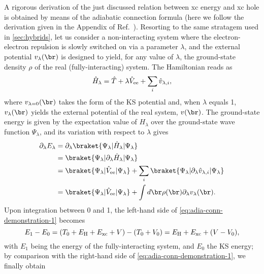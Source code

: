 A rigorous derivation of the just discussed relation between xc energy and xc hole is obtained by means of the adiabatic connection formula (here we follow the derivation given in the Appendix of Ref.~\cite{becke_correlation_1988}). Resorting to the same stratagem used in \cref{sec:hybrids}, let us consider a non-interacting system where the electron-electron repulsion is slowly switched on via a parameter $\lambda$, and the external potential $v_{\lambda}(\br)$ is designed to yield, for any value of $\lambda$, the ground-state density $\rho$ of the real (fully-interacting) system. The Hamiltonian reads as
%
\begin{equation}
    \hat{H}_{\lambda} = \hat{T} + \lambda \hat{V}_{\rm ee} + \sum_i \hat{v}_{\lambda,i} ,
    \label{eq:adia-conn-hamiltonian}
\end{equation}
%
where $v_{\lambda=0}(\br)$ takes the form of the KS potential and, when $\lambda$ equals 1, $v_{\lambda}(\br)$ yields the external potential of the real system, $v(\br)$. The ground-state energy is given by the expectation value of $H_{\lambda}$ over the ground-state wave function $\Psi_{\lambda}$, and its variation with respect to $\lambda$ gives
%
\begin{equation}
    \begin{split}
    \partial_{\lambda} E_{\lambda} &= \partial_{\lambda} \braket{\Psi_{\lambda} | \hat{H}_{\lambda} | \Psi_{\lambda}} \\
    &= \braket{\Psi_{\lambda} | \partial_{\lambda} \hat{H}_{\lambda} | \Psi_{\lambda}} \\
    &= \braket{\Psi_{\lambda} | \hat{V}_{\rm ee} | \Psi_{\lambda}} + \sum_i \braket{\Psi_{\lambda} | \partial_{\lambda} \hat{v}_{\lambda,i} | \Psi_{\lambda}} \\
    &= \braket{\Psi_{\lambda} | \hat{V}_{\rm ee} | \Psi_{\lambda}} + \int d\br \rho(\br) \partial_{\lambda} v_{\lambda}(\br) .
    \end{split}
    \label{eq:adia-conn-demonstration-1}
\end{equation}
%
Upon integration between 0 and 1, the left-hand side of \cref{eq:adia-conn-demonstration-1} becomes
%
\begin{equation}
    E_1 - E_0 = (T_0 + E_{\rm H} + E_{\rm xc} + V) - (T_0 + V_0) = E_{\rm H} + E_{\rm xc} + (V - V_0) ,
    \label{eq:adia-conn-demonstration-2}
\end{equation}
%
with $E_1$ being the energy of the fully-interacting system, and $E_0$ the KS energy; by comparison with the right-hand side of \cref{eq:adia-conn-demonstration-1}, we finally obtain
